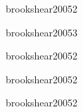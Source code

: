 \begin{syllabus}
\begin{unit}{\PFONEDef}{brookshear2005}{2}
\end{unit}

\begin{unit}{\PFTWODef}{brookshear2005}{3}

   \begin{topics}
      \item \PFTWOTopicEl
      \item \PFTWOTopicElConcepto
   \end{topics}

   \begin{unitgoals}
      \item \PFTWOObjONE
      \item \PFTWOObjTHREE
      \item \PFTWOObjFOUR
   \end{unitgoals}

\end{unit}

\begin{unit}{\PFTHREEDef}{brookshear2005}{2}

   \begin{topics}
      \item \PFTHREETopicTipos
      \item \PFTHREETopicArreglos
   \end{topics}

   \begin{unitgoals}
      \item \PFTHREEObjONE
   \end{unitgoals}

\end{unit}

\begin{unit}{\ALONEDef}{brookshear2005}{2}

   \begin{topics}
      \item \ALONETopicIdentificar
   \end{topics}

   \begin{unitgoals}
      \item \ALONEObjTHREE
   \end{unitgoals}

\end{unit}

\begin{unit}{\ALTWODef}{brookshear2005}{2}

   \begin{topics}
      \item \ALTWOTopicAlgoritmos
      \item \ALTWOTopicDividir
   \end{topics}


\end{unit}
\end{syllabus}
